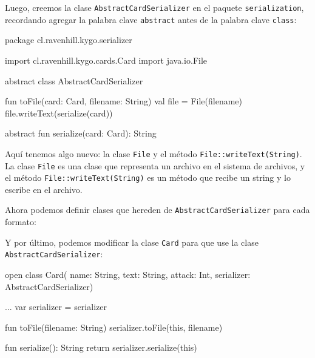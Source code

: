   Luego, creemos la clase \texttt{AbstractCardSerializer} en el paquete \texttt{serialization}, 
  recordando agregar la palabra clave \texttt{abstract} antes de la palabra clave \texttt{class}:

  \begin{kotlin}
    package cl.ravenhill.kygo.serializer

    import cl.ravenhill.kygo.cards.Card
    import java.io.File


    abstract class AbstractCardSerializer {
      fun toFile(card: Card, filename: String) {
        val file = File(filename)
        file.writeText(serialize(card))
      }

      abstract fun serialize(card: Card): String
    }
  \end{kotlin}

  Aquí tenemos algo nuevo: la clase \texttt{File} y el método \texttt{File::writeText(String)}.
  La clase \texttt{File} es una clase que representa un archivo en el sistema de archivos, y el
  método \texttt{File::writeText(String)} es un método que recibe un string y lo escribe en el
  archivo.

  Ahora podemos definir clases que hereden de \texttt{AbstractCardSerializer} para cada formato:




  Y por último, podemos modificar la clase \texttt{Card} para que use la clase
  \texttt{AbstractCardSerializer}:

  \begin{kotlin}
    open class Card(
      name: String, text: String, attack: Int, 
      serializer: AbstractCardSerializer) {
      ...
      var serializer = serializer

      fun toFile(filename: String) {
        serializer.toFile(this, filename)
      }

      fun serialize(): String {
        return serializer.serialize(this)
      }
    }
  \end{kotlin}

